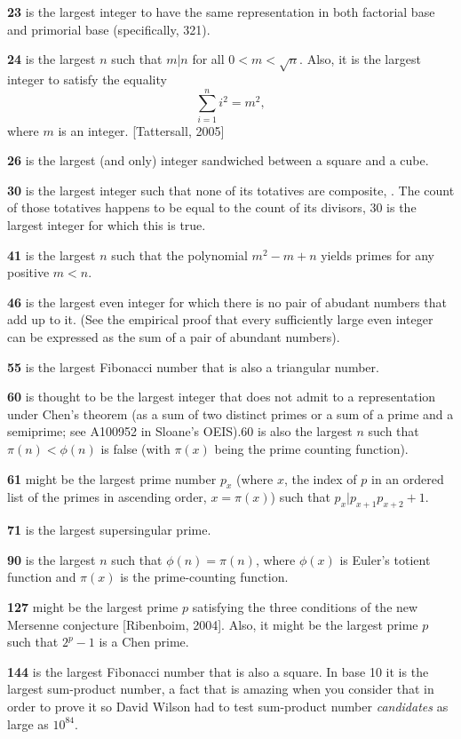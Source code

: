 \documentclass[12pt]{article}
\begin{document}
{\bf 23} is the largest integer to have the same representation in both factorial base and primorial base (specifically, 321).

{\bf 24} is the largest $n$ such that $m|n$ for all $0 < m < \sqrt{n}$. Also, it is the largest integer to satisfy the equality $$\sum_{i = 1}^n i^2 = m^2,$$ where $m$ is an integer. [Tattersall, 2005]

{\bf 26} is the largest (and only) integer sandwiched between a square and a cube.

{\bf 30} is the largest integer such that none of its totatives are composite, . The count of those totatives happens to be equal to the count of its divisors, 30 is the largest integer for which this is true.

{\bf 41} is the largest $n$ such that the polynomial $m^2 - m + n$ yields primes for any positive $m < n$.

{\bf 46} is the largest even integer for which there is no pair of abudant numbers that add up to it. (See the empirical proof that every sufficiently large even integer can be expressed as the sum of a pair of abundant numbers).

{\bf 55} is the largest Fibonacci number that is also a triangular number.

{\bf 60} is thought to be the largest integer that does not admit to a representation under Chen's theorem (as a sum of two distinct primes or a sum of a prime and a semiprime; see A100952 in Sloane's OEIS).60 is also the largest $n$ such that $\pi(n) < \phi(n)$ is false (with $\pi(x)$ being the prime counting function).

{\bf 61} might be the largest prime number $p_x$ (where $x$, the index of $p$ in an ordered list of the primes in ascending order, $x = \pi(x)$) such that $p_x|p_{x + 1}p_{x + 2} + 1$.

{\bf 71} is the largest supersingular prime.

{\bf 90} is the largest $n$ such that $\phi(n) = \pi(n)$, where $\phi(x)$ is Euler's totient function and $\pi(x)$ is the prime-counting function.

{\bf 127} might be the largest prime $p$ satisfying the three conditions of the new Mersenne conjecture [Ribenboim, 2004]. Also, it might be the largest prime $p$ such that $2^p - 1$ is a Chen prime.

{\bf 144} is the largest Fibonacci number that is also a square. In base 10 it is the largest sum-product number, a fact that is amazing when you consider that in order to prove it so David Wilson had to test sum-product number {\em candidates} as large as $10^{84}$.
\end{document}
